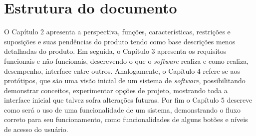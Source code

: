 \section{Estrutura do documento}

O Capítulo 2 apresenta a perspectiva, funções, características, restrições e suposições e suas pendências do produto tendo como base descrições menos detalhadas do produto. Em seguida, o Capítulo 3 apresenta os requisitos funcionais e não-funcionais, descrevendo o que o \textit{software} realiza e como realiza, desempenho, interface entre outros. Analogamente, o Capítulo 4 refere-se aos protótipos, que são uma visão inicial de um sistema de \textit{software}, possibilitando demonstrar conceitos, experimentar opções de projeto, mostrando toda a interface inicial que talvez sofra alterações futuras. Por fim o Capítulo 5 descreve como será o uso de uma funcionalidade de um sistema, demonstrando o fluxo correto para seu funcionamento, como funcionalidades de alguns botões e níveis de acesso do usuário.